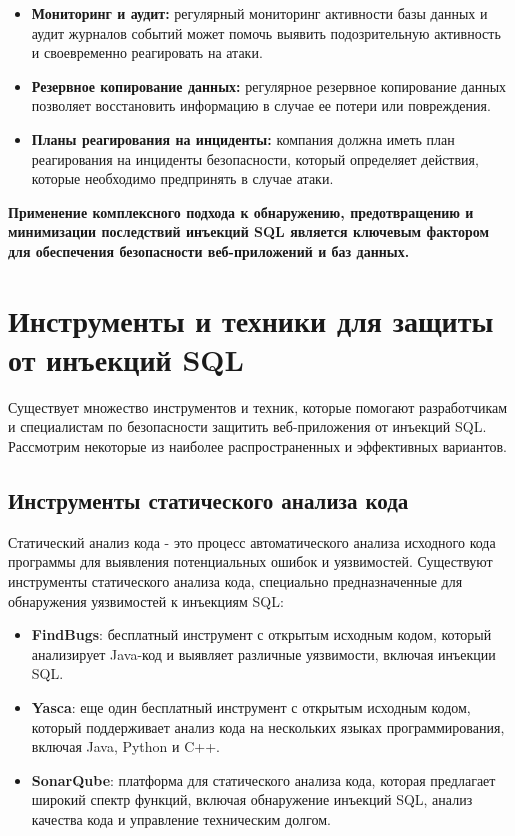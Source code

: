 \documentclass[a4paper,12pt]{diplom}
\begin{document}
	 \begin{itemize}
	 	\item \textbf{Мониторинг и аудит:} регулярный мониторинг активности базы данных и аудит журналов событий может помочь выявить подозрительную активность и своевременно реагировать на атаки. 
	 	\item \textbf{Резервное копирование данных:} регулярное резервное копирование данных позволяет восстановить информацию в случае ее потери или повреждения. 
	 	\item \textbf{Планы реагирования на инциденты:} компания должна иметь план реагирования на инциденты безопасности, который определяет действия, которые необходимо предпринять в случае атаки. 
	 \end{itemize}
	 
	 \textbf{Применение комплексного подхода к обнаружению, предотвращению и минимизации последствий инъекций SQL является ключевым фактором для обеспечения безопасности веб-приложений и баз данных.} 
	 
	 
	 
	 
	 
	 
	 
	 
	 \section{Инструменты и техники для защиты от инъекций SQL}
	 
	 Существует множество инструментов и техник, которые помогают разработчикам и специалистам по безопасности защитить веб-приложения от инъекций SQL.  Рассмотрим некоторые из наиболее распространенных и эффективных вариантов.
	 
	 \subsection{Инструменты статического анализа кода}
	 
	 Статический анализ кода - это процесс автоматического анализа исходного кода программы для выявления потенциальных ошибок и уязвимостей.  Существуют инструменты статического анализа кода,  специально предназначенные для обнаружения уязвимостей к инъекциям SQL:
	 
	 \begin{itemize}
	 	\item \textbf{FindBugs}:  бесплатный инструмент с открытым исходным кодом, который анализирует Java-код и выявляет различные уязвимости,  включая инъекции SQL. \cite{FindBugs_tool}
	 	\item \textbf{Yasca}:  еще один бесплатный инструмент с открытым исходным кодом, который поддерживает анализ кода на нескольких языках программирования,  включая Java,  Python и C++. \cite{Yasca_tool}
	 	\item \textbf{SonarQube}:  платформа для статического анализа кода,  которая предлагает широкий спектр функций,  включая обнаружение инъекций SQL,  анализ качества кода и управление техническим долгом. \cite{SonarQube_tool}
	 \end{itemize}
	 
\end{document}
